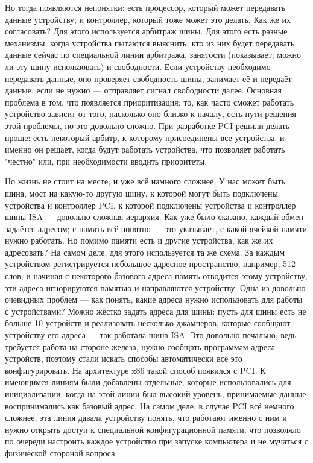 \documentclass[main.tex]{subfiles}
\begin{document}
Но тогда появляются непонятки: есть процессор, который может
передавать данные устройству, и контроллер, который тоже может это делать.
Как же их согласовать? Для этого используется арбитраж шины.
Для этого есть разные механизмы: когда устройства пытаются выяснить,
кто из них будет передавать данные сейчас по специальной линии арбитража,
занятости (показывает, можно ли эту шину использовать) и свободности.
Если устройству необходимо передавать данные, оно проверяет свободность
шины, занимает её и передаёт данные, если не нужно --- отправляет
сигнал свободности далее. Основная проблема в том, что появляется
приоритизация: то, как часто сможет работать устройство зависит от того,
насколько оно близко к началу, есть пути решения этой проблемы, но это
довольно сложно. При разработке PCI решили делать проще:
есть некоторый арбитр, к которому присоединены все устройства,
и именно он решает, когда будут работать устройства, что позволяет
работать "честно" или, при необходимости вводить приоритеты.

Но жизнь не стоит на месте, и уже всё намного сложнее. У нас может
быть шина, мост на какую-то другую шину, к которой могут быть
подключены устройства и контроллер PCI, к которой подключены
устройства и контроллер шины ISA --- довольно сложная иерархия.
Как уже было сказано, каждый обмен задаётся адресом; с память всё понятно ---
это указывает, с какой ячейкой памяти нужно работать. Но помимо памяти есть и
другие устройства, как же их адресовать? На самом деле, для этого используется
та же схема. За каждым устройством регистрируется небольшое адресное
пространство, например, 512 слов, и начиная с некоторого базового адреса
память отводится этому устройству, эти адреса игнорируются памятью
и направляются устройству. Одна из довольно очевидных проблем ---
как понять, какие адреса нужно использовать для работы с устройствами?
Можно жёстко задать адреса для шины: пусть для шины есть не больше 10 устройств
и реализовать несколько джамперов, которые сообщают устройству его
адреса --- так работала шина ISA. Это довольно печально, ведь требуется
работа на стороне железа, нужно сообщать программам адреса устройств,
поэтому стали искать способы автоматически всё это конфигурировать.
На архитектуре x86 такой способ появился с PCI.
К имеющимся линиям были добавлены отдельные, которые использовались для
инициализации: когда на этой линии был высокий уровень, принимаемые данные
воспринимались как базовый адрес. На самом деле, в случае PCI всё немного
сложнее, эта линия давала устройству понять, что работают именно с ним и
нужно открыть доступ к специальной конфигурационной памяти, что позволяло
по очереди настроить каждое устройство при запуске компьютера и не мучаться
с физической стороной вопроса.
\end{document}
